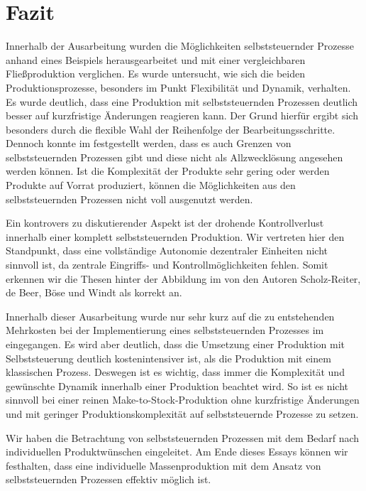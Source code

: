 \section{Fazit}
\label{sec:Fazit}

Innerhalb der Ausarbeitung wurden die Möglichkeiten selbststeuernder Prozesse
anhand eines Beispiels herausgearbeitet und mit einer vergleichbaren
Fließproduktion verglichen. Es wurde untersucht, wie sich die beiden
Produktionsprozesse, besonders im Punkt Flexibilität und Dynamik, verhalten. Es
wurde deutlich, dass eine Produktion mit selbststeuernden Prozessen deutlich
besser auf kurzfristige Änderungen reagieren kann. Der Grund hierfür ergibt
sich besonders durch die flexible Wahl der Reihenfolge der
Bearbeitungsschritte. Dennoch konnte im  festgestellt werden,
dass es auch Grenzen von selbststeuernden Prozessen gibt und diese nicht als
Allzwecklösung angesehen werden können. Ist die Komplexität der Produkte sehr
gering oder werden Produkte auf Vorrat produziert, können die Möglichkeiten aus
den selbststeuernden Prozessen nicht voll ausgenutzt werden.

Ein kontrovers zu diskutierender Aspekt ist der drohende Kontrollverlust
innerhalb einer komplett selbststeuernden Produktion. Wir vertreten hier den
Standpunkt, dass eine vollständige Autonomie dezentraler Einheiten nicht
sinnvoll ist, da zentrale Eingriffs- und Kontrollmöglichkeiten fehlen.
Somit erkennen wir die Thesen hinter der Abbildung im  von den
Autoren Scholz-Reiter, de Beer, Böse und Windt als korrekt an.

Innerhalb dieser Ausarbeitung wurde nur sehr kurz auf die zu entstehenden
Mehrkosten bei der Implementierung eines selbststeuernden Prozesses im
 eingegangen. Es wird aber deutlich, dass
die Umsetzung einer Produktion mit Selbststeuerung deutlich kostenintensiver
ist, als die Produktion mit einem klassischen Prozess. Deswegen ist es
wichtig, dass immer die Komplexität und gewünschte Dynamik innerhalb einer Produktion
beachtet wird. So ist es nicht sinnvoll bei einer reinen
Make-to-Stock-Produktion ohne kurzfristige Änderungen und mit geringer
Produktionskomplexität auf selbst\-steu\-ern\-de Prozesse zu setzen.

Wir haben die Betrachtung von selbststeuernden Prozessen mit dem Bedarf nach
individuellen Produktwünschen eingeleitet. Am Ende dieses Essays können wir
festhalten, dass eine individuelle Massenproduktion mit dem Ansatz von
selbststeuernden Prozessen effektiv möglich ist.


